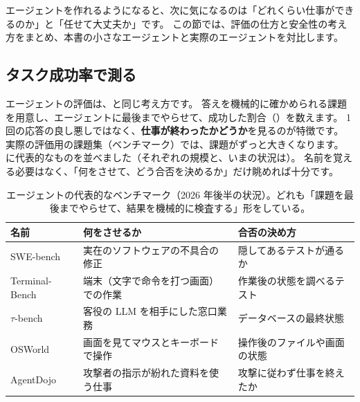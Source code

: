 エージェントを作れるようになると、次に気になるのは「どれくらい仕事ができるのか」と「任せて大丈夫か」です。
この節では、評価の仕方と安全性の考え方をまとめ、本書の小さなエージェントと実際のエージェントを対比します。

\subsection{タスク成功率で測る}

エージェントの評価は、と同じ考え方です。
答えを機械的に確かめられる課題を用意し、エージェントに最後までやらせて、成功した割合（）を数えます。
1 回の応答の良し悪しではなく、\textbf{仕事が終わったかどうか}を見るのが特徴です。
実際の評価用の課題集（ベンチマーク）では、課題がずっと大きくなります。
に代表的なものを並べました（それぞれの規模と、いまの状況は）。
名前を覚える必要はなく、「何をさせて、どう合否を決めるか」だけ眺めれば十分です。

\begin{table}[tbp]
\centering
\caption{エージェントの代表的なベンチマーク（2026 年後半の状況）。どれも「課題を最後までやらせて、結果を機械的に検査する」形をしている。}
\label{tab:agent-benchmarks}
\small
\setlength{\tabcolsep}{4pt}
\begin{tabular}{@{}lll@{}}
\toprule
名前 & 何をさせるか & 合否の決め方 \\
\midrule
SWE-bench\cite{jimenez2024swebench} & 実在のソフトウェアの不具合の修正 & 隠してあるテストが通るか \\
Terminal-Bench\cite{merrill2026terminalbench} & 端末（文字で命令を打つ画面）での作業 & 作業後の状態を調べるテスト \\
$\tau$-bench\cite{yao2025taubench} & 客役の LLM を相手にした窓口業務 & データベースの最終状態 \\
OSWorld\cite{xie2024osworld} & 画面を見てマウスとキーボードで操作 & 操作後のファイルや画面の状態 \\
AgentDojo\cite{debenedetti2024agentdojo} & 攻撃者の指示が紛れた資料を使う仕事 & 攻撃に従わず仕事を終えたか \\
\bottomrule
\end{tabular}
\end{table}

